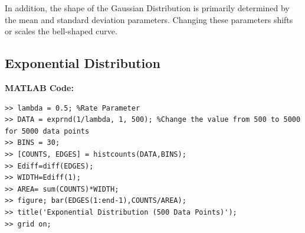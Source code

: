 \documentclass{article}
\theoremstyle{mytheoremstyle}
\theoremstyle{mytheoremstyle}
\theoremstyle{myproblemstyle}
\begin{document}
In addition, the shape of the Gaussian Distribution is primarily determined by the mean and standard deviation parameters. Changing these parameters shifts or scales the bell-shaped curve.


\newpage
\subsection*{Exponential Distribution}

\textbf{MATLAB Code:}
\begin{lstlisting}[caption={Exponential Distribution},label={Exponential}]
>> lambda = 0.5; %Rate Parameter
>> DATA = exprnd(1/lambda, 1, 500); %Change the value from 500 to 5000 for 5000 data points
>> BINS = 30; 
>> [COUNTS, EDGES] = histcounts(DATA,BINS); 
>> Ediff=diff(EDGES); 
>> WIDTH=Ediff(1);
>> AREA= sum(COUNTS)*WIDTH;
>> figure; bar(EDGES(1:end-1),COUNTS/AREA);
>> title('Exponential Distribution (500 Data Points)'); 
>> grid on;
\end{lstlisting}
\end{document}
